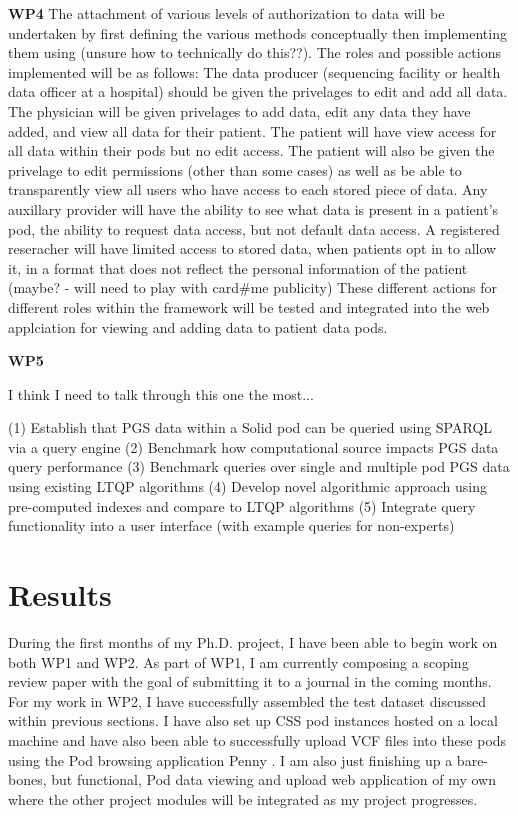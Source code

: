 \documentclass[runningheads]{llncs}
\begin{document}
\textbf{WP4}
The attachment of various levels of authorization to data will be undertaken by first defining the various methods conceptually then implementing them using (unsure how to technically do this??). 
The roles and possible actions implemented will be as follows:
The data producer (sequencing facility or health data officer at a hospital) should be given the privelages to edit and add all data. 
The physician will be given privelages to add data, edit any data they have added, and view all data for their patient.
The patient will have view access for all data within their pods but no edit access.
The patient will also be given the privelage to edit permissions (other than some cases) as well as be able to transparently view all users who have access to each stored piece of data.
Any auxillary provider will have the ability to see what data is present in a patient's pod, the ability to request data access, but not default data access.
A registered reseracher will have limited access to stored data, when patients opt in to allow it, in a format that does not reflect the personal information of the patient (maybe? - will need to play with card#me publicity)
These different actions for different roles within the framework will be tested and integrated into the web applciation for viewing and adding data to patient data pods. 

\textbf{WP5}

I think I need to talk through this one the most... 

(1) Establish that PGS data within a Solid pod can be queried using SPARQL via a query engine
(2) Benchmark how computational source impacts PGS data query performance
(3) Benchmark queries over single and multiple pod PGS data using existing LTQP algorithms
(4) Develop novel algorithmic approach using pre-computed indexes and compare to LTQP algorithms
(5) Integrate query functionality into a user interface (with example queries for non-experts)


\section{Results}

During the first months of my Ph.D. project, I have been able to begin work on both WP1 and WP2. 
As part of WP1, I am currently composing a scoping review paper with the goal of submitting it to a journal in the coming months.
For my work in WP2, I have successfully assembled the test dataset discussed within previous sections.
I have also set up CSS pod instances hosted on a local machine and have also been able to successfully upload VCF files into these pods using the Pod browsing application Penny \cite{penny}. 
I am also just finishing up a bare-bones, but functional, Pod data viewing and upload web application of my own where the other project modules will be integrated as my project progresses.
\end{document}
